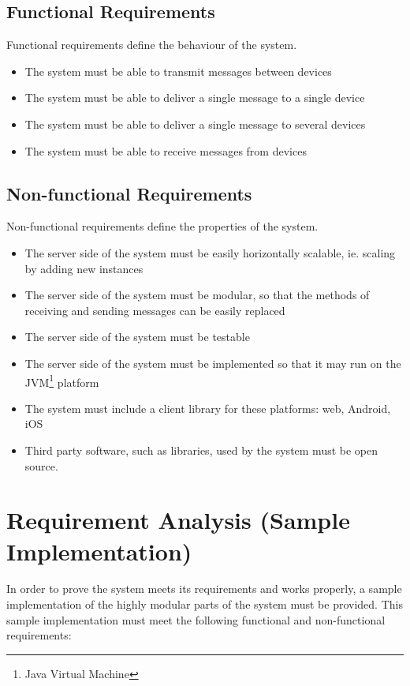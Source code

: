 \subsection{Functional Requirements}
Functional requirements define the behaviour of the system.
\begin{itemize}
\item The system must be able to transmit messages between devices
\item The system must be able to deliver a single message to a single device
\item The system must be able to deliver a single message to several devices
\item The system must be able to receive messages from devices
\end{itemize}

\subsection{Non-functional Requirements}
Non-functional requirements define the properties of the system.
\begin{itemize}
\item The server side of the system must be easily horizontally scalable, ie. scaling by adding new instances
\item The server side of the system must be modular, so that the methods of receiving and sending messages can be easily replaced
\item The server side of the system must be testable
\item The server side of the system must be implemented so that it may run on the JVM\footnote{Java Virtual Machine} platform
\item The system must include a client library for these platforms: web, Android, iOS
\item Third party software, such as libraries, used by the system must be open source.
\end{itemize}

\section{Requirement Analysis (Sample Implementation)} \label{sec:sample-implementation-analysis}

In order to prove the system meets its requirements and works properly, a sample implementation of the highly modular parts of the system must be provided. This sample implementation must meet the following functional and non-functional requirements:

